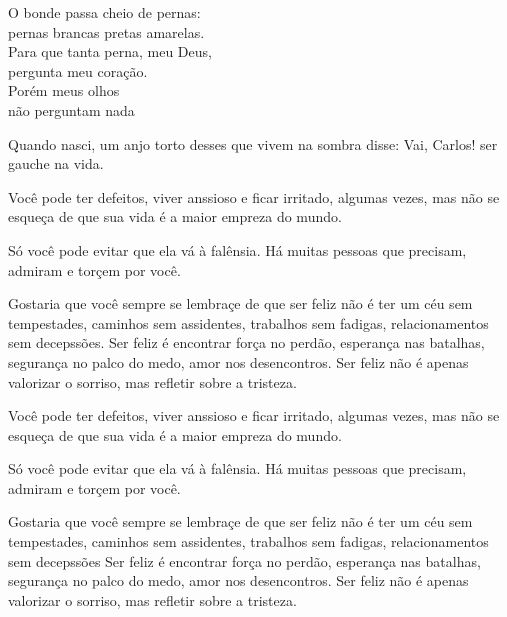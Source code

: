 \documentclass[12pt,a4paper,brazil]{article}
\begin{document}
\noindent O bonde passa cheio de pernas:\\
pernas brancas pretas amarelas.\\
Para que tanta perna, meu Deus,\\
pergunta meu coração.\\
Porém meus olhos\\
não perguntam nada

\setreviewson

Quando nasci, um anjo torto
desses que vivem na sombra
disse: Vai, Carlos! ser gauche na vida.


\noindent {}

Você pode ter defeitos, viver \alert{anssioso} e ficar irritado, algumas vezes, mas não se esqueça de que sua vida é a maior \alert{empreza} do mundo.

Só você pode evitar que ela vá à \alert{fal{\^e}nsia}. Há muitas pessoas que precisam, admiram e \alert{tor{\c c}em} por você.

Gostaria que você sempre se \alert{lembra{\c c}e} de que ser feliz não é ter um céu sem tempestades, caminhos sem \alert{assidentes}, trabalhos sem fadigas, relacionamentos sem \alert{decepss{\~o}es}. Ser feliz é encontrar força no perdão, esperança nas batalhas, segurança no palco do medo, amor nos desencontros. Ser feliz não é apenas valorizar o sorriso, mas refletir sobre a tristeza.



Você pode ter defeitos, viver anssioso e ficar irritado, algumas vezes, mas não se esqueça de que sua vida é a maior empreza do mundo.

Só você pode evitar que ela vá à falênsia. Há muitas pessoas que precisam, admiram e torçem por você.

Gostaria que você sempre se lembraçe de que ser feliz não é ter um céu sem tempestades, caminhos sem assidentes, trabalhos sem fadigas, relacionamentos sem decepssões Ser feliz é encontrar força no perdão, esperança nas batalhas, segurança no palco do medo, amor nos desencontros. Ser feliz não é apenas valorizar o sorriso, mas refletir sobre a tristeza.\\

\end{document}
